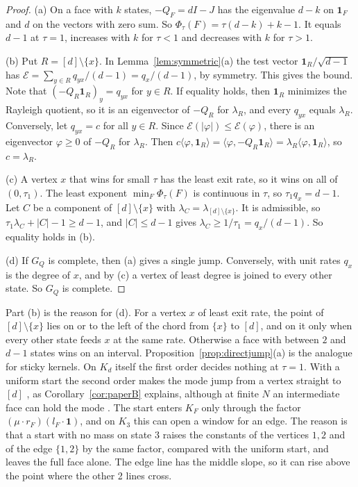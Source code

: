 \begin{proof}
(a) On a face with $k$ states, $-Q_F=dI-J$ has the eigenvalue $d-k$ on
$\mathbf 1_F$ and $d$ on the vectors with zero sum. So
$\Phi_\tau(F)=\tau(d-k)+k-1$. It equals $d-1$ at $\tau=1$, increases with $k$
for $\tau<1$ and decreases with $k$ for $\tau>1$.

(b) Put $R=[d]\setminus\{x\}$. In Lemma~\ref{lem:symmetric}(a) the test vector
$\mathbf 1_R/\sqrt{d-1}$ has $\mathcal E=\sum_{y\in R}q_{yx}/(d-1)=q_x/(d-1)$,
by symmetry. This gives the bound. Note that $(-Q_R\mathbf 1_R)_y=q_{yx}$ for
$y\in R$. If equality holds, then $\mathbf 1_R$ minimizes the Rayleigh quotient,
so it is an eigenvector of $-Q_R$ for $\lambda_R$, and every $q_{yx}$ equals
$\lambda_R$. Conversely, let $q_{yx}=c$ for all $y\in R$. Since
$\mathcal E(\lvert\varphi\rvert)\le\mathcal E(\varphi)$, there is an
eigenvector $\varphi\ge0$ of $-Q_R$ for $\lambda_R$. Then
$c\langle\varphi,\mathbf 1_R\rangle=\langle\varphi,-Q_R\mathbf 1_R\rangle
=\lambda_R\langle\varphi,\mathbf 1_R\rangle$, so $c=\lambda_R$.

(c) A vertex $x$ that wins for small $\tau$ has the least exit rate, so it wins
on all of $(0,\tau_1)$. The least exponent $\min_F\Phi_\tau(F)$ is continuous
in $\tau$, so
$\tau_1q_x=d-1$. Let $C$ be a component of $[d]\setminus\{x\}$ with
$\lambda_C=\lambda_{[d]\setminus\{x\}}$. It is admissible, so
$\tau_1\lambda_C+\lvert C\rvert-1\ge d-1$, and $\lvert C\rvert\le d-1$ gives
$\lambda_C\ge1/\tau_1=q_x/(d-1)$. So equality holds in (b).

(d) If $G_Q$ is complete, then (a) gives a single jump. Conversely, with unit
rates $q_x$ is the degree of $x$, and by (c) a vertex of least degree is joined
to every other state. So $G_Q$ is complete.
\end{proof}

Part (b) is the reason for (d). For a vertex $x$ of least exit rate, the point
of $[d]\setminus\{x\}$ lies on or to the left of the chord from $\{x\}$ to
$[d]$, and on it only when every other state feeds $x$ at the same rate.
Otherwise a face with between $2$ and $d-1$ states wins on an interval.
Proposition~\ref{prop:directjump}(a) is the analogue for sticky kernels. On
$K_d$ itself the first order decides nothing at $\tau=1$. With a uniform start
the second order makes the mode jump from a vertex straight to $[d]$
\cite[Cor.~3.7]{paperB}, as Corollary~\ref{cor:paperB} explains, although at
finite $N$ an intermediate face can hold the mode \cite[Ex.~3.8]{paperB}. The
start enters $K_F$ only through the factor $(\mu\cdot r_F)(l_F\cdot\mathbf 1)$,
and on $K_3$ this can open a window for an edge. The reason is that a start with
no mass on state $3$ raises the constants of the vertices $1,2$ and of the edge
$\{1,2\}$ by the same factor, compared with the uniform start, and leaves the
full face alone. The edge line has the middle slope, so it can rise above the
point where the other 2 lines cross.

